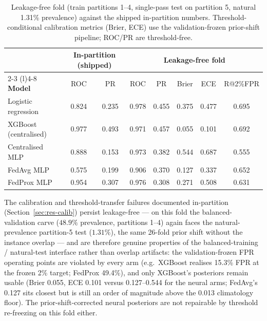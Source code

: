 \begin{table}[t]
\centering
\caption{Leakage-free fold (train partitions 1--4, single-pass test on
partition 5, natural 1.31\% prevalence) against the shipped
in-partition numbers. Threshold-conditional calibration metrics
(Brier, ECE) use the validation-frozen prior-shift pipeline; ROC/PR
are threshold-free.}
\label{tab:leakfree}
\small
\begin{tabular}{@{}l c c c c c c c@{}}
\toprule
 & \multicolumn{2}{c}{\textbf{In-partition (shipped)}} &
 \multicolumn{5}{c}{\textbf{Leakage-free fold}} \\
\cmidrule(r){2-3} \cmidrule(l){4-8}
\textbf{Model} & ROC & PR & ROC & PR & Brier & ECE & R@2\%FPR \\
\midrule
Logistic regression & 0.824 & 0.235 & 0.978 & 0.455 & 0.375 & 0.477 & 0.695 \\
XGBoost (centralised) & 0.977 & 0.493 & 0.971 & 0.457 & 0.055 & 0.101 & 0.692 \\
Centralised MLP & 0.888 & 0.153 & 0.973 & 0.382 & 0.544 & 0.687 & 0.555 \\
FedAvg MLP & 0.575 & 0.199 & 0.906 & 0.370 & 0.127 & 0.337 & 0.652 \\
FedProx MLP & 0.954 & 0.307 & 0.976 & 0.308 & 0.271 & 0.508 & 0.631 \\
\bottomrule
\end{tabular}
\end{table}

The calibration and threshold-transfer failures documented
in-partition (Section~\ref{sec:res-calib}) persist leakage-free ---
on this fold the balanced-validation carve ($48.9\%$ prevalence,
partitions 1--4) again faces the natural-prevalence partition-5 test
($1.31\%$), the same 26-fold prior shift without the instance overlap ---
and are therefore genuine properties of the balanced-training /
natural-test interface rather than overlap artifacts: the
validation-frozen FPR operating points are violated by every arm
(e.g.\ XGBoost realises 15.3\% FPR at the frozen 2\% target; FedProx
49.4\%), and only XGBoost's posteriors remain usable (Brier 0.055,
ECE 0.101 versus 0.127--0.544 for the neural arms; FedAvg's 0.127
sits closest but is still an order of magnitude above the 0.013
climatology floor). The
prior-shift-corrected neural posteriors are not repairable by
threshold re-freezing on this fold either.

